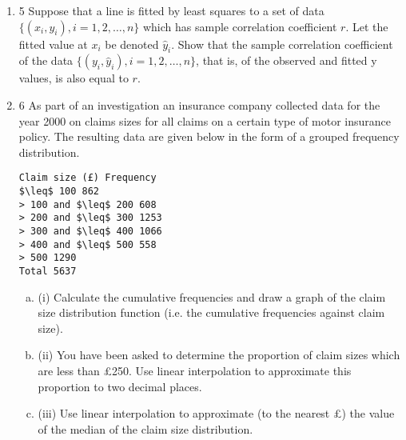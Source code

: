 \documentclass[a4paper,12pt]{article}
\begin{document}
\begin{enumerate}
\item 5 Suppose that a line is fitted by least squares to a set of data $\{ ( x_i , y_i ) , i = 1, 2, \ldots , n \}$
which has sample correlation coefficient $r$. Let the fitted value at $x_i$ be denoted $\hat{y}_i$.
Show that the sample correlation coefficient of the data $\{ (  y_i, \hat{y}_i ) , i = 1, 2, \ldots , n \}$, that
is, of the observed and fitted y values, is also equal to $r$. 
\item 6 As part of an investigation an insurance company collected data for the year 2000 on
claims sizes for all claims on a certain type of motor insurance policy. The resulting
data are given below in the form of a grouped frequency distribution.
\begin{verbatim}
Claim size (£) Frequency
$\leq$ 100 862
> 100 and $\leq$ 200 608
> 200 and $\leq$ 300 1253
> 300 and $\leq$ 400 1066
> 400 and $\leq$ 500 558
> 500 1290
Total 5637
\end{verbatim}


\begin{enumerate}[(a)]
    \item (i) Calculate the cumulative frequencies and draw a graph of the claim size
distribution function (i.e. the cumulative frequencies against claim size). 
    \item (ii) You have been asked to determine the proportion of claim sizes which are less
than £250. Use linear interpolation to approximate this proportion to two
decimal places. 
    \item (iii) Use linear interpolation to approximate (to the nearest £) the value of the
median of the claim size distribution. 
\end{enumerate}


\end{enumerate}
\end{document}
